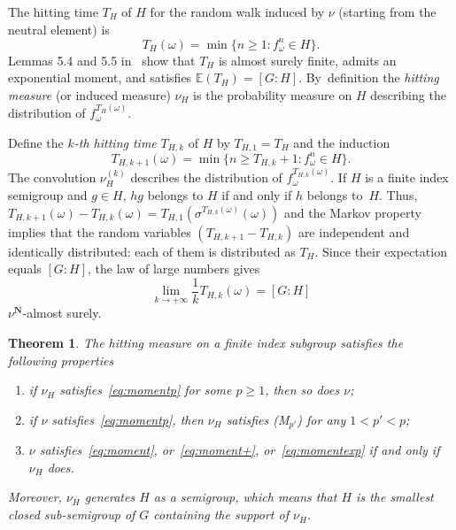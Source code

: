 \documentclass[11pt]{article}
\let\sep :
\newcommand{\aset}[1]{\{#1\}}
\newcommand{\bset}[1]{\bigl\{#1\bigr\}}
\newcommand{\ee}{\mathbb{E}}
\def\N{\mathbf{N}}
\theoremstyle{plain}
\newtheorem{thm}{Theorem}[section]
\theoremstyle{definition}
\numberwithin{equation}{section}
\begin{document}
The hitting time $T_{H}$ of $H$ for the random walk
induced by $\nu$ (starting from the neutral element) is
\begin{equation*}
T_H(\omega) = \min\bset {n\geq 1\sep f^n_\omega \in H}.
\end{equation*}
Lemmas 5.4 and 5.5 in~\cite{benoist-quint_book} show that $T_H$ is almost surely finite,
admits an exponential moment, and satisfies $\ee(T_{H}) = [G:H]$. By~definition the \emph{hitting measure} (or induced measure)
$\nu_H$ is the probability measure on $H$ describing the distribution of $f^{T_{H}(\omega)}_\omega$.

Define the \emph{$k$-th hitting time} $T_{H,k}$ of $H$ by $T_{H,1}=T_H$ and the induction\vspace*{-3pt}
\begin{equation*}
T_{H,k+1}(\omega) = \min\aset{n\geq T_{H,k}+1\sep  f_\omega^{n} \in H}.
\end{equation*}
The convolution $\nu_H^{(k)}$ describes the distribution
of $f^{T_{H,k}(\omega)}_\omega$.
If $H$ is a finite index semigroup and $g\in H$, $hg$ belongs to $H$ if and only if $h$ belongs to~$H$. Thus,
$T_{H, k+1}(\omega) - T_{H, k}(\omega) = T_{H, 1}(\sigma^{T_{H, k}(\omega)}(\omega))$ and the Markov property implies that the random variables $(T_{H, k+1} - T_{H, k})$ are independent and identically distributed: each of them is distributed as $T_H$. Since their expectation equals $[G:H]$,
the law of large numbers gives\vspace*{-3pt}\enlargethispage{.6\baselineskip}
\begin{equation*}\label{eq:limit_kth_hitting_time}
\lim_{k\to+\infty} \frac{1}{k}T_{H, k}(\omega)=[G:H]
\end{equation*} $\nu^\N$-almost surely.

\begin{thm}\label{thm:M$_2$} The hitting measure on a finite index subgroup satisfies the following properties
\begin{enumerate}
\item\label{thm:M$_2$1} if $\nu_H$ satisfies~\eqref{eq:momentp} for some $p\geq 1$, then so does $\nu$;
\item\label{thm:M$_2$2} if $\nu$ satisfies~\eqref{eq:momentp}, then $\nu_H$ satisfies (M$_{p'}$) for any $1 < p' < p$;
\item\label{thm:M$_2$3} $\nu$ satisfies~\eqref{eq:moment}, or~\eqref{eq:moment+}, or~\eqref{eq:momentexp} if and only if $\nu_H$ does.
\end{enumerate}
Moreover, $\nu_H$ generates $H$ as a semigroup, which means that $H$ is the smallest closed sub-semigroup of $G$ containing the support of $\nu_H$.
\end{thm}
\end{document}

